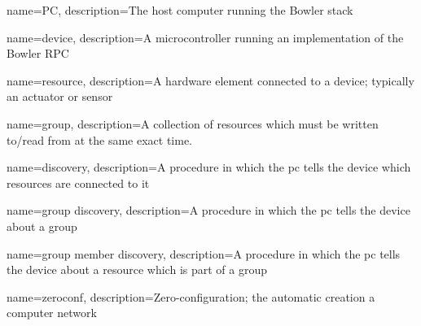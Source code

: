 {
    name=PC,
    description={The host computer running the Bowler stack}
}

{
    name=device,
    description={A microcontroller running an implementation of the Bowler RPC}
}

{
    name=resource,
    description={A hardware element connected to a \Gls{device}; typically an actuator or sensor}
}

{
    name=group,
    description={A collection of \Glspl{resource} which must be written to/read from at the same
    exact time.}
}

{
    name=discovery,
    description={A procedure in which the \Gls{pc} tells the \Gls{device} which \Glspl{resource} are
    connected to it}
}

{
    name=group discovery,
    description={A procedure in which the \Gls{pc} tells the \Gls{device} about a \Gls{group}}
}

{
    name=group member discovery,
    description={A procedure in which the \Gls{pc} tells the \Gls{device} about a
    \Gls{resource} which is part of a \Gls{group}}
}

{
    name=zeroconf,
    description={Zero-configuration; the automatic creation a computer network}
}


